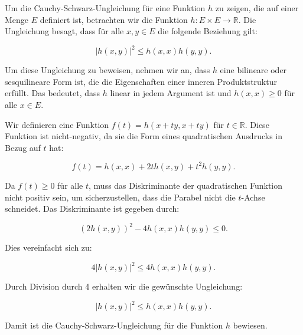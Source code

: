 Um die Cauchy-Schwarz-Ungleichung für eine Funktion \( h \) zu zeigen, die auf einer Menge \( E \) definiert ist, betrachten wir die Funktion \( h: E \times E \to \mathbb{R} \). Die Ungleichung besagt, dass für alle \( x, y \in E \) die folgende Beziehung gilt:

\[
|h(x, y)|^2 \leq h(x, x) h(y, y).
\]

Um diese Ungleichung zu beweisen, nehmen wir an, dass \( h \) eine bilineare oder sesquilineare Form ist, die die Eigenschaften einer inneren Produktstruktur erfüllt. Das bedeutet, dass \( h \) linear in jedem Argument ist und \( h(x, x) \geq 0 \) für alle \( x \in E \).

Wir definieren eine Funktion \( f(t) = h(x + ty, x + ty) \) für \( t \in \mathbb{R} \). Diese Funktion ist nicht-negativ, da sie die Form eines quadratischen Ausdrucks in Bezug auf \( t \) hat:

\[
f(t) = h(x, x) + 2t h(x, y) + t^2 h(y, y).
\]

Da \( f(t) \geq 0 \) für alle \( t \), muss das Diskriminante der quadratischen Funktion nicht positiv sein, um sicherzustellen, dass die Parabel nicht die \( t \)-Achse schneidet. Das Diskriminante ist gegeben durch:

\[
(2h(x, y))^2 - 4h(x, x)h(y, y) \leq 0.
\]

Dies vereinfacht sich zu:

\[
4|h(x, y)|^2 \leq 4h(x, x)h(y, y).
\]

Durch Division durch 4 erhalten wir die gewünschte Ungleichung:

\[
|h(x, y)|^2 \leq h(x, x)h(y, y).
\]

Damit ist die Cauchy-Schwarz-Ungleichung für die Funktion \( h \) bewiesen.